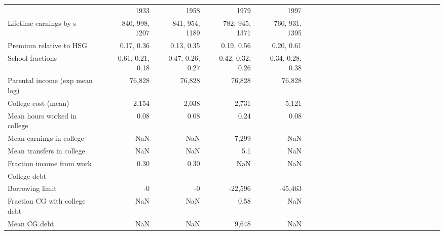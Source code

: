 \begin{tabular}{lrrrrrrrrrrrrrrrrrrrrrrr}
\hline
 & 1933  & 1958  & 1979  & 1997  &   &   &   &   &   &   &   &   &   &   &   &   &   &   &   &   &   &   &   \\ 
Lifetime earnings by s & 840, 998, 1207  & 841, 954, 1189  & 782, 945, 1371  & 760, 931, 1395  &   &   &   &   &   &   &   &   &   &   &   &   &   &   &   &   &   &   &   \\ 
Premium relative to HSG & 0.17, 0.36  & 0.13, 0.35  & 0.19, 0.56  & 0.20, 0.61  &   &   &   &   &   &   &   &   &   &   &   &   &   &   &   &   &   &   &   \\ 
School fractions & 0.61, 0.21, 0.18  & 0.47, 0.26, 0.27  & 0.42, 0.32, 0.26  & 0.34, 0.28, 0.38  &   &   &   &   &   &   &   &   &   &   &   &   &   &   &   &   &   &   &   \\ 
Parental income (exp mean log) & 76,828  & 76,828  & 76,828  & 76,828  &   &   &   &   &   &   &   &   &   &   &   &   &   &   &   &   &   &   &   \\ 
College cost (mean) & 2,154  & 2,038  & 2,731  & 5,121  &   &   &   &   &   &   &   &   &   &   &   &   &   &   &   &   &   &   &   \\ 
Mean hours worked in college & 0.08  & 0.08  & 0.24  & 0.08  &   &   &   &   &   &   &   &   &   &   &   &   &   &   &   &   &   &   &   \\ 
Mean earnings in college & NaN  & NaN  & 7,299  & NaN  &   &   &   &   &   &   &   &   &   &   &   &   &   &   &   &   &   &   &   \\ 
Mean transfers in college & NaN  & NaN  & 5.1  & NaN  &   &   &   &   &   &   &   &   &   &   &   &   &   &   &   &   &   &   &   \\ 
Fraction income from work & 0.30  & 0.30  & NaN  & NaN  &   &   &   &   &   &   &   &   &   &   &   &   &   &   &   &   &   &   &   \\ 
College debt &   &   &   &   &   &   &   &   &   &   &   &   &   &   &   &   &   &   &   &   &   &   &   \\ 
Borrowing limit & -0  & -0  & -22,596  & -45,463  &   &   &   &   &   &   &   &   &   &   &   &   &   &   &   &   &   &   &   \\ 
Fraction CG with college debt & NaN  & NaN  & 0.58  & NaN  &   &   &   &   &   &   &   &   &   &   &   &   &   &   &   &   &   &   &   \\ 
Mean CG debt & NaN  & NaN  & 9,648  & NaN  &   &   &   &   &   &   &   &   &   &   &   &   &   &   &   &   &   &   &   \\ 
\hline
\end{tabular}%
